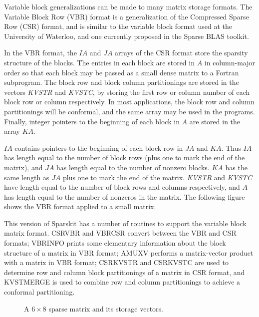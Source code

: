 Variable block generalizations can be made to many matrix storage
formats.  The Variable Block Row (VBR) format is a generalization of the
Compressed Sparse Row (CSR) format, and is similar to the variable
block format used at the University of Waterloo, and one currently
proposed in the Sparse BLAS toolkit.

In the VBR format, the $IA$ and $JA$ arrays of the CSR format store the
sparsity structure of the blocks.  The entries in each block are stored
in $A$ in column-major order so that each block may be passed as a small
dense matrix to a Fortran subprogram.  The block row and block column
partitionings are stored in the vectors {\em KVSTR} and {\em KVSTC},
by storing the first row or column number of each block row or column
respectively.  In most applications, the block row and column partitionings
will be conformal, and the same array may be used in the programs.
Finally, integer pointers to the beginning of each block in $A$ are stored
in the array $KA$.

$IA$ contains pointers to the beginning of each block row in $JA$ and $KA$.
Thus $IA$ has length equal to the number of block rows (plus one to mark
the end of the matrix), and $JA$ has length equal to the number of nonzero
blocks.  $KA$ has the same length as $JA$ plus one to mark the end of
the matrix.  {\em KVSTR} and {\em KVSTC} have length equal to the number
of block rows and columns respectively, and $A$ has length equal to the
number of nonzeros in the matrix.  The following
figure shows the VBR format applied to a small matrix.

This version of Sparskit has a number of routines to support the variable
block matrix format.  CSRVBR and VBRCSR convert between the VBR and CSR
formats; VBRINFO prints some elementary information about the block
structure of a matrix in VBR format; AMUXV performs a matrix-vector product
with a matrix in VBR format; CSRKVSTR and CSRKVSTC are used
to determine row and column block partitionings of a matrix in CSR format,
and KVSTMERGE is used to combine row and column partitionings to achieve
a conformal partitioning.

\begin{figure}[htb]
\centerline{}
\caption {A $6 \times 8$ sparse matrix and its storage vectors.}
\end{figure}

